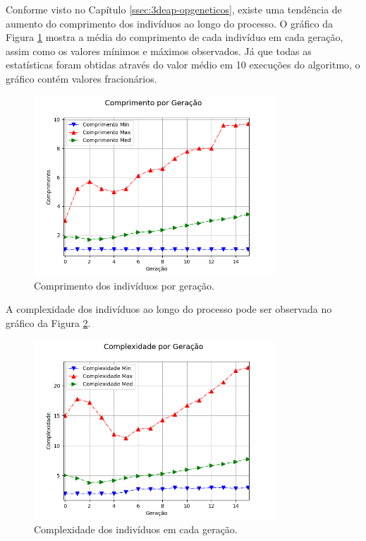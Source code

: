 Conforme visto no Capítulo \ref{ssec:3deap-opgeneticos}, existe uma tendência de aumento do comprimento dos indivíduos ao longo do processo. O gráfico da Figura \ref{fig:4ec-cartpolecompr} mostra a média do comprimento de cada indivíduo em cada geração, assim como os valores mínimos e máximos observados. Já que todas as estatísticas foram obtidas através do valor médio em 10 execuções do algoritmo, o gráfico contém valores fracionários.

\begin{figure}[H]
	\centering
	\includegraphics[width=0.8\textwidth]{02_desenvolvimento/04_EC_Fig_CartpoleCompr.png}
	\caption{Comprimento dos indivíduos por geração.}
	\label{fig:4ec-cartpolecompr}
\end{figure}

A complexidade dos indivíduos ao longo do processo pode ser observada no gráfico da Figura \ref{fig:4ec-cartpolecompl}.

\begin{figure}[H]
	\centering
	\includegraphics[width=0.8\textwidth]{02_desenvolvimento/04_EC_Fig_CartpoleCompl.png}
	\caption{Complexidade dos indivíduos em cada geração. }
	\label{fig:4ec-cartpolecompl}
\end{figure}

